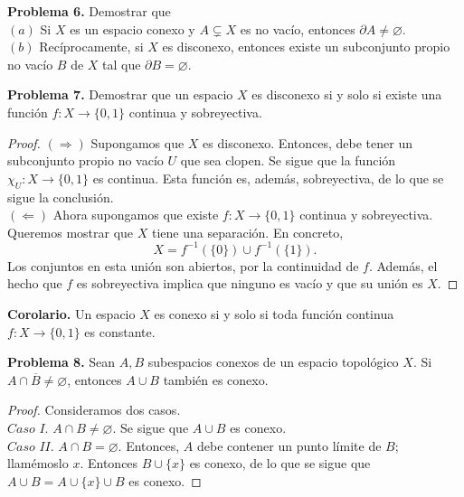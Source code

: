 \documentclass{article}
\begin{document}
\begin{mybox}
	\textbf{Problema 6. } Demostrar que \\
	$(a)$ Si $X$ es un espacio conexo y $A \subsetneq X$ es no vacío, entonces $\partial A \neq \varnothing$. \\
	$(b)$ Recíprocamente, si $X$ es disconexo, entonces existe un subconjunto propio no vacío $B$ de $X$ tal que $\partial B = \varnothing$.
	
\end{mybox}	

\begin{mybox}
	\textbf{Problema 7. } Demostrar que un espacio $X$ es disconexo si y solo si existe una función $f:X \rightarrow \{0, 1\}$ continua y sobreyectiva. 
\end{mybox}	

\begin{proof}
	$(\Rightarrow)$ Supongamos que $X$ es disconexo. Entonces, debe tener un subconjunto propio no vacío $U$ que sea clopen. Se sigue que la función $\chi_{U}: X \rightarrow \{0, 1\}$ es continua. Esta función es, además, sobreyectiva, de lo que se sigue la conclusión.\\
	$(\Leftarrow)$ Ahora supongamos que existe $f: X \rightarrow \{0, 1 \}$ continua y sobreyectiva. Queremos mostrar que $X$ tiene una separación. En concreto,
	$$ X = f^{-1}(\{0\}) \cup f^{-1}(\{1\}) .$$
	Los conjuntos en esta unión son abiertos, por la continuidad de $f$. Además, el hecho que $f$ es sobreyectiva implica que ninguno es vacío y que su unión es $X$.  
\end{proof}

\textbf{Corolario. } Un espacio $X$ es conexo si y solo si toda función continua $f:X \rightarrow \{0, 1\}$ es constante.   

\begin{mybox}
\textbf{Problema 8. } Sean $A, B$ subespacios conexos de un espacio topológico $X$. Si $A \cap \overline{B} \neq \varnothing$, entonces $A \cup B$ también es conexo. 
\end{mybox}	
\begin{proof}
	Consideramos dos casos. \\
	
	$\textit{Caso I.}$ $A \cap B \neq \varnothing$. Se sigue que $A \cup B$ es conexo. \\
	
	$\textit{Caso II.}$ $A \cap B = \varnothing$. Entonces, $A$ debe contener un punto límite de $B$; llamémoslo $x$. Entonces $B \cup \{x\}$ es conexo, de lo que se sigue que $A \cup B = A \cup \{ x \} \cup B$ es conexo. 	
\end{proof}
\end{document}
